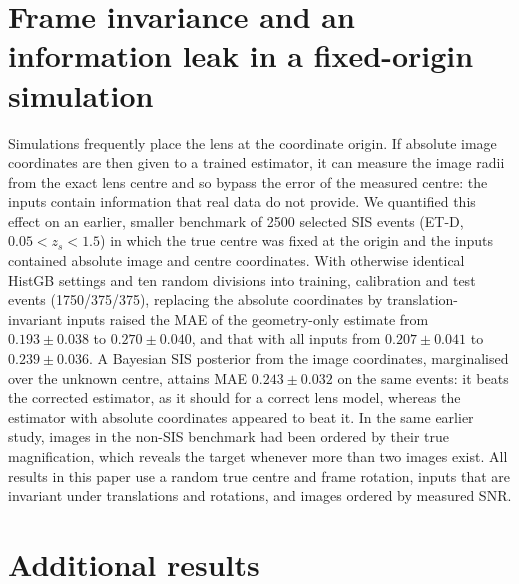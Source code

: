 \section{Frame invariance and an information leak in a fixed-origin simulation}
\label{app:leak}
Simulations frequently place the lens at the coordinate origin. If absolute image coordinates are then given to a trained estimator, it can measure the image radii from the exact lens centre and so bypass the error of the measured centre: the inputs contain information that real data do not provide. We quantified this effect on an earlier, smaller benchmark of 2500 selected SIS events (ET-D, $0.05<z_s<1.5$) in which the true centre was fixed at the origin and the inputs contained absolute image and centre coordinates. With otherwise identical HistGB settings and ten random divisions into training, calibration and test events (1750/375/375), replacing the absolute coordinates by translation-invariant inputs raised the MAE of the geometry-only estimate from $0.193\pm0.038$ to $0.270\pm0.040$, and that with all inputs from $0.207\pm0.041$ to $0.239\pm0.036$. A Bayesian SIS posterior from the image coordinates, marginalised over the unknown centre, attains MAE $0.243\pm0.032$ on the same events: it beats the corrected estimator, as it should for a correct lens model, whereas the estimator with absolute coordinates appeared to beat it. In the same earlier study, images in the non-SIS benchmark had been ordered by their true magnification, which reveals the target whenever more than two images exist. All results in this paper use a random true centre and frame rotation, inputs that are invariant under translations and rotations, and images ordered by measured SNR.

\section{Additional results}
\label{app:extra}

